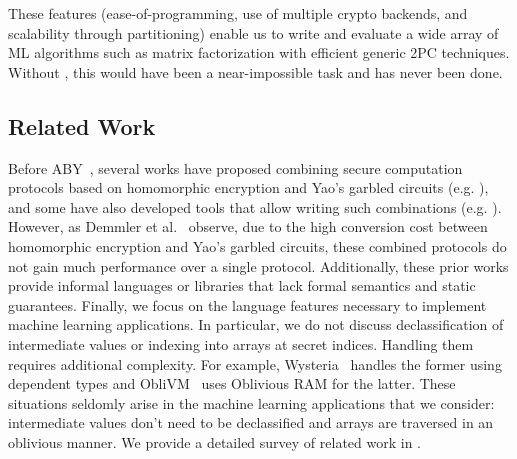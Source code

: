 These features (ease-of-programming, use of multiple crypto backends, and scalability through partitioning) enable us to write and evaluate a wide array of ML algorithms such as matrix factorization with efficient generic 2PC techniques. Without \tool, this would have been a near-impossible task and has never been done.



\subsection{Related Work}
Before ABY~\cite{aby}, several works have proposed
combining secure computation protocols based on homomorphic
encryption and Yao's garbled circuits
(e.g. \cite{barni,blanton,brickell,franz,huang,valeriaMatrix,valeriaRidge,schropferK11}),
and some have also developed tools that allow writing such
combinations (e.g. \cite{bogdanov,lone,tasty,autoS}). However, as Demmler et
al.~\cite{aby} observe, due
 to the high conversion cost between
homomorphic encryption and Yao's garbled circuits, these combined
protocols do not gain much performance over a single
protocol. 
Additionally, these prior works provide informal languages
or libraries that lack formal semantics and static guarantees.
Finally, we focus on the language
features necessary to implement machine learning applications.
In particular, we do not discuss declassification of
intermediate values or indexing into arrays at secret indices.
 Handling them requires additional complexity. For example,
Wysteria~\cite{wysteria} handles the former using dependent types
and ObliVM~\cite{oblivm} uses Oblivious RAM for the latter.
These situations seldomly arise in the machine learning applications that we consider:
intermediate values don't need to be declassified and arrays are traversed in an oblivious manner. We provide a detailed survey of related
work in .

 

